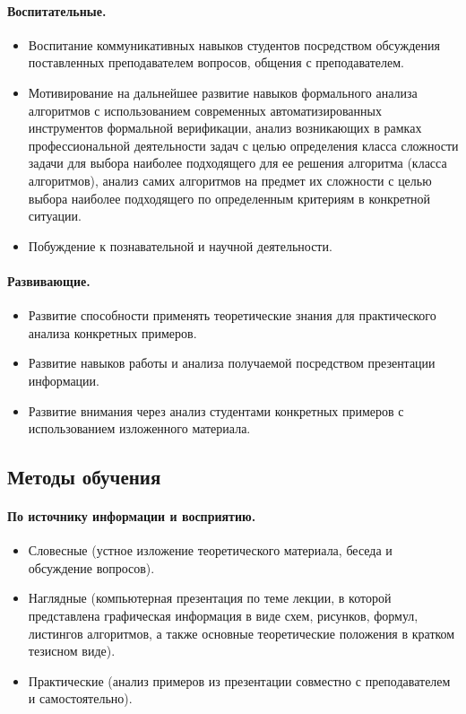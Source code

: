 \begin{refsection}
    \paragraph{Воспитательные.} \begin{itemize}
        \item Воспитание коммуникативных навыков студентов посредством обсуждения поставленных преподавателем вопросов, общения с преподавателем.
        \item Мотивирование на дальнейшее развитие навыков формального анализа алгоритмов с использованием современных автоматизированных инструментов формальной верификации, анализ возникающих в рамках профессиональной деятельности задач с целью определения класса сложности задачи для выбора наиболее подходящего для ее решения алгоритма (класса алгоритмов), анализ самих алгоритмов на предмет их сложности с целью выбора наиболее подходящего по определенным критериям в конкретной ситуации.
        \item Побуждение к познавательной и научной деятельности.
    \end{itemize}

    \paragraph{Развивающие.} \begin{itemize}
        \item Развитие способности применять теоретические знания для практического анализа конкретных примеров.
        \item Развитие навыков работы и анализа получаемой посредством презентации информации.
        \item Развитие внимания через анализ студентами конкретных примеров с использованием изложенного материала.
    \end{itemize}

\subsection{Методы обучения}

    \paragraph{По источнику информации и восприятию.} \begin{itemize}
        \item Словесные (устное изложение теоретического материала, беседа и обсуждение вопросов).
        \item Наглядные (компьютерная презентация по теме лекции, в которой представлена графическая информация в виде схем, рисунков, формул, листингов алгоритмов, а также основные теоретические положения в кратком тезисном виде).
        \item Практические (анализ примеров из презентации совместно с преподавателем и самостоятельно).
    \end{itemize}


\end{refsection}
